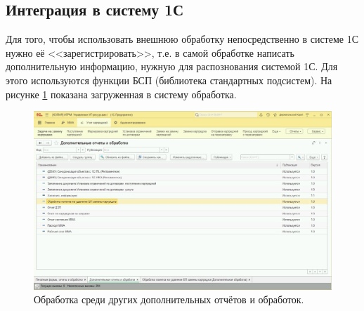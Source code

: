     \subsection{Интеграция в систему 1С}
    Для того, чтобы использовать внешнюю обработку непосредственно в системе 1С нужно её <<зарегистрировать>>, т.е. в самой обработке написать дополнительную информацию, нужную для распознования системой 1С. Для этого используются функции БСП (библиотека стандартных подсистем). На рисунке \ref{external} показана загруженная в систему обработка. 

    \begin{figure}[H]
        \centering
        \includegraphics[width=14cm]{pictures/external.png}
        \caption{Обработка среди других дополнительных отчётов и обработок.}  \label{external}
    \end{figure}